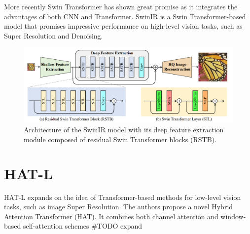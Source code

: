More recently Swin Transformer\cite{liu2021swin}  has shown great promise as it integrates the advantages of both CNN and
Transformer. SwinIR\cite{liang2021swinir} is a Swin Transformer-based model that promises impressive performance on high-level vision tasks, such as Super Resolution and Denoising.

\begin{figure}[H]
  \centering
  \includegraphics[scale=0.35]{figures/SwinIR.png}
  \caption{Architecture of the SwinIR model with its deep feature extraction module composed of residual Swin Transformer blocks (RSTB).\cite{liang2021swinir}}
  \label{img:swinir}
\end{figure}

\section{HAT-L}
\label{subsec:hatl}

HAT-L expands on the idea of Transformer-based methods for low-level vision tasks, such as image Super Resolution. The authors propose a novel Hybrid Attention Transformer (HAT). It combines both channel attention and window-based self-attention schemes \#TODO expand


